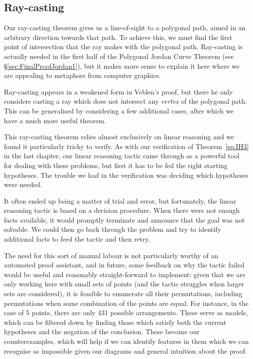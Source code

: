 \subsection{Ray-casting}\label{sec:RayCasting}
Our ray-casting theorem gives us a line-of-sight to a polygonal path, aimed in an arbitrary direction towards that path. To achieve this, we must find the first point of intersection that the ray makes with the polygonal path. Ray-casting is actually needed in the first half of the Polygonal Jordan Curve Theorem (see \S\ref{sec:FinalProofJordan1}), but it makes more sense to explain it here where we are appealing to metaphors from computer graphics.

Ray-casting appears in a weakened form in Veblen's proof, but there he only considers casting a ray which does not intersect any \emph{vertex} of the polygonal path. This can be generalised by considering a few additional cases, after which we have a much more useful theorem.

This ray-casting theorem relies almost exclusively on linear reasoning and we found it particularly tricky to verify. As with our verification of Theorem~\ref{eq:IH3} in the last chapter, our linear reasoning tactic came through as a powerful tool for dealing with these problems, but first it has to be fed the right starting hypotheses. The trouble we had in the verification was deciding which hypotheses were needed.

It often ended up being a matter of trial and error, but fortunately, the linear reasoning tactic is based on a decision procedure. When there were not enough facts available, it would promptly terminate and announce that the goal was not solvable. We could then go back through the problem and try to identify additional facts to feed the tactic and then retry.

The need for this sort of manual labour is not particularly worthy of an automated proof assistant, and in future, some feedback on why the tactic failed would be useful and reasonably straight-forward to implement: given that we are only working here with small sets of points (and the tactic struggles when larger sets are considered), it is feasible to enumerate all their permutations, including permutations when some combination of the points are equal. For instance, in the case of 5 points, there are only 431 possible arrangements. These serve as models, which can be filtered down by finding those which satisfy both the current hypotheses and the negation of the conclusion. These become our counterexamples, which will help if we can identify features in them which we can recognise as impossible given our diagrams and general intuition about the proof.

